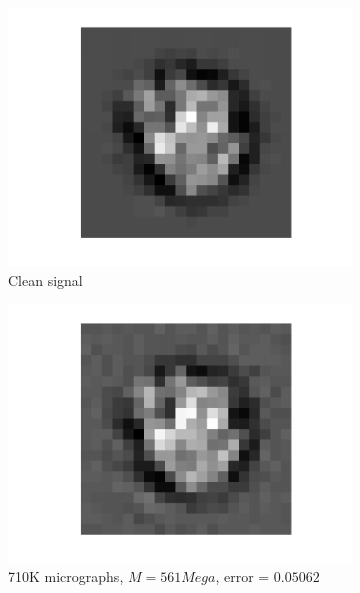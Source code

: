 \documentclass[english,11pt]{article}
\numberwithin{equation}{section}
\theoremstyle{plain}
\theoremstyle{definition}
\theoremstyle{remark}
\theoremstyle{plain}
\theoremstyle{remark}
\theoremstyle{plain}
\theoremstyle{plain}
\begin{document}
\begin{figure}[ht!]
	\begin{subfigure}{.5\textwidth}
	\centering
	\includegraphics[scale=0.5]{signal2D_clean}
	\caption{Clean signal}
	\label{fig:signal2D_clean}
\end{subfigure}%
\begin{subfigure}{.5\textwidth}
	\centering
	\includegraphics[scale=0.5]{signal2D_LS_all_images}
	\caption{710K micrographs, $M=561Mega$, error  = $0.05062$}
	\label{fig:signal2D_LS}
\end{subfigure}
\begin{subfigure}{.5\textwidth}
	\centering

\end{subfigure}
\end{figure}
\end{document}
